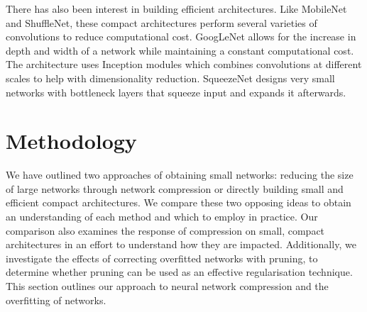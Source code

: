 \documentclass[conference]{IEEEtran}
\begin{document}
There has also been interest in building efficient architectures. Like MobileNet and ShuffleNet, these compact architectures perform several varieties of convolutions to reduce computational cost. GoogLeNet \cite{szegedy2015googlenet} allows for the increase in depth and width of a network while maintaining a constant computational cost. The architecture uses Inception modules which combines convolutions at different scales to help with dimensionality reduction. SqueezeNet \cite{iandola2016squeezenet} designs very small networks with bottleneck layers that squeeze input and expands it afterwards.





\section{Methodology}
We have outlined two approaches of obtaining small networks: reducing the size of large networks through network compression or directly building small and efficient compact architectures. We compare these two opposing ideas to obtain an understanding of each method and which to employ in practice. Our comparison also examines the response of compression on small, compact architectures in an effort to understand how they are impacted. Additionally, we investigate the effects of correcting overfitted networks with pruning, to determine whether pruning can be used as an effective regularisation technique. This section outlines our approach to neural network compression and the overfitting of networks. 
\end{document}
